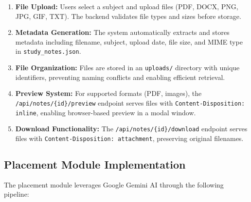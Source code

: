 \documentclass[12pt]{article}
\begin{document}
\begin{enumerate}
    \item \textbf{File Upload:} Users select a subject and upload files (PDF, DOCX, PNG, JPG, GIF, TXT). The backend validates file types and sizes before storage.
    
    \item \textbf{Metadata Generation:} The system automatically extracts and stores metadata including filename, subject, upload date, file size, and MIME type in \texttt{study\_notes.json}.
    
    \item \textbf{File Organization:} Files are stored in an \texttt{uploads/} directory with unique identifiers, preventing naming conflicts and enabling efficient retrieval.
    
    \item \textbf{Preview System:} For supported formats (PDF, images), the \texttt{/api/notes/\{id\}/preview} endpoint serves files with \texttt{Content-Disposition: inline}, enabling browser-based preview in a modal window.
    
    \item \textbf{Download Functionality:} The \texttt{/api/notes/\{id\}/download} endpoint serves files with \texttt{Content-Disposition: attachment}, preserving original filenames.
\end{enumerate}

\subsection{Placement Module Implementation}
The placement module leverages Google Gemini AI through the following pipeline:
\end{document}

